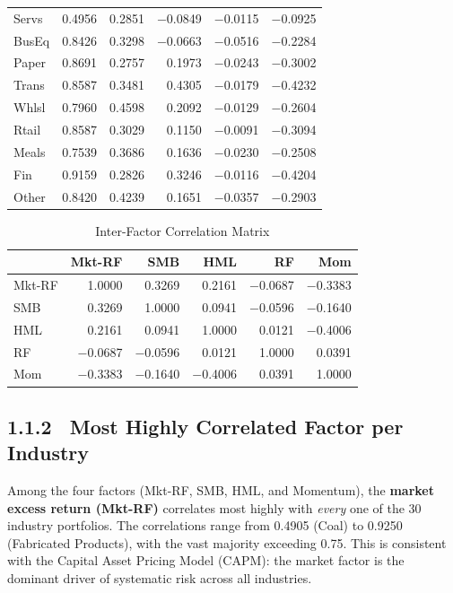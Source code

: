 \documentclass[12pt]{article}
\begin{document}
\begin{table}[H]
\begin{tabular}{l r r r r r}
			Servs &  0.4956 &  0.2851 & $-$0.0849 & $-$0.0115 & $-$0.0925 \\
			BusEq &  0.8426 &  0.3298 & $-$0.0663 & $-$0.0516 & $-$0.2284 \\
			Paper &  0.8691 &  0.2757 &  0.1973 & $-$0.0243 & $-$0.3002 \\
			Trans &  0.8587 &  0.3481 &  0.4305 & $-$0.0179 & $-$0.4232 \\
			Whlsl &  0.7960 &  0.4598 &  0.2092 & $-$0.0129 & $-$0.2604 \\
			Rtail &  0.8587 &  0.3029 &  0.1150 & $-$0.0091 & $-$0.3094 \\
			Meals &  0.7539 &  0.3686 &  0.1636 & $-$0.0230 & $-$0.2508 \\
			Fin   &  0.9159 &  0.2826 &  0.3246 & $-$0.0116 & $-$0.4204 \\
			Other &  0.8420 &  0.4239 &  0.1651 & $-$0.0357 & $-$0.2903 \\
			\bottomrule
		\end{tabular}
	\end{table}
	
	\begin{table}[H]
		\centering
		\caption{Inter-Factor Correlation Matrix}
		\label{tab:corr_factor}
		\begin{tabular}{l r r r r r}
			\toprule
			& \textbf{Mkt-RF} & \textbf{SMB} & \textbf{HML} & \textbf{RF} & \textbf{Mom} \\
			\midrule
			Mkt-RF &  1.0000 &  0.3269 &  0.2161 & $-$0.0687 & $-$0.3383 \\
			SMB    &  0.3269 &  1.0000 &  0.0941 & $-$0.0596 & $-$0.1640 \\
			HML    &  0.2161 &  0.0941 &  1.0000 &  0.0121 & $-$0.4006 \\
			RF     & $-$0.0687 & $-$0.0596 &  0.0121 &  1.0000 &  0.0391 \\
			Mom    & $-$0.3383 & $-$0.1640 & $-$0.4006 &  0.0391 &  1.0000 \\
			\bottomrule
		\end{tabular}
	\end{table}
	
	\subsection{1.1.2 \ Most Highly Correlated Factor per Industry}
	
	Among the four factors (Mkt-RF, SMB, HML, and Momentum), the \textbf{market excess return (Mkt-RF)} correlates most highly with \emph{every} one of the 30 industry portfolios. The correlations range from 0.4905 (Coal) to 0.9250 (Fabricated Products), with the vast majority exceeding 0.75. This is consistent with the Capital Asset Pricing Model (CAPM): the market factor is the dominant driver of systematic risk across all industries.
	
\end{document}
